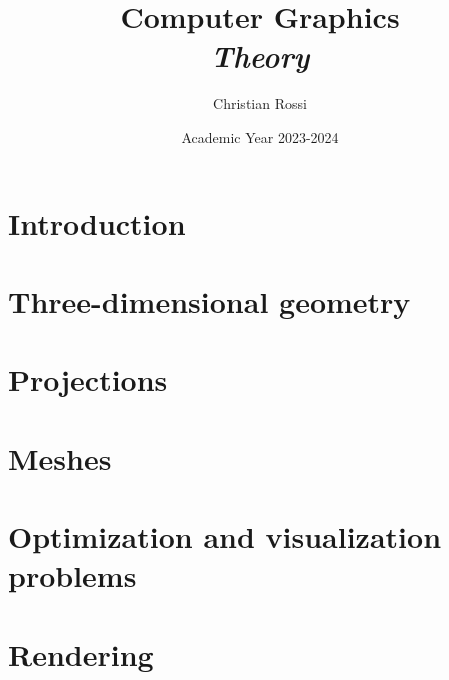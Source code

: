 \documentclass[12pt, a4paper]{report}
\title{Computer Graphics \\ \textit{Theory}}
\author{Christian Rossi}
\date{Academic Year 2023-2024}
\begin{document}
    \maketitle

    

    \cleardoublepage{}

    \tableofcontents

    \cleardoublepage{}

    \chapter{Introduction}
    
    
    

    \chapter{Three-dimensional geometry}
    
    
    
    

    \chapter{Projections}
    
    
    
    
    
    
    
    \chapter{Meshes}
    
    
    

    \chapter{Optimization and visualization problems}
    
    
    
    
    

    \chapter{Rendering}
    
    
    
    
    
    
    
    
    
\end{document}
